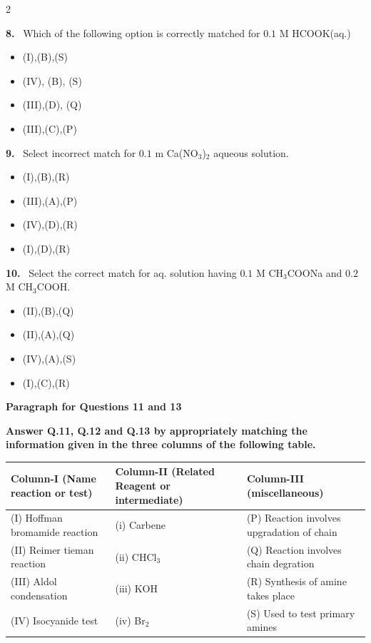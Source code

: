 \documentclass[10pt]{extarticle}
\newcommand{\qn}[1]{\par\smallskip\noindent\textbf{#1.}~}
\newcommand{\paraq}[2]{\par\smallskip\noindent\textbf{Paragraph for Questions #1 and #2}\par}
\newenvironment{qoptions}{\begin{itemize}[leftmargin=1.8em,itemsep=1pt,topsep=2pt,label={}]}{\end{itemize}}
\newcommand{\opt}[2]{\item[(#1)] #2}
\begin{document}
\begin{multicols}{2}
\qn{8} Which of the following option is correctly matched for $0.1$ M HCOOK(aq.)
\begin{qoptions}
\opt{A}{(I),(B),(S)}
\opt{B}{(IV), (B), (S)}
\opt{C}{(III),(D), (Q)}
\opt{D}{(III),(C),(P)}
\end{qoptions}
\qn{9} Select incorrect match for $0.1$ m Ca(NO$_3$)$_2$ aqueous solution.
\begin{qoptions}
\opt{A}{(I),(B),(R)}
\opt{B}{(III),(A),(P)}
\opt{C}{(IV),(D),(R)}
\opt{D}{(I),(D),(R)}
\end{qoptions}
\qn{10} Select the correct match for aq. solution having $0.1$ M CH$_3$COONa and $0.2$ M CH$_3$COOH.
\begin{qoptions}
\opt{A}{(II),(B),(Q)}
\opt{B}{(II),(A),(Q)}
\opt{C}{(IV),(A),(S)}
\opt{D}{(I),(C),(R)}
\end{qoptions}
\paraq{11}{13}
\noindent\textbf{Answer Q.11, Q.12 and Q.13 by appropriately matching the information given in the three columns of the following table.}\par
\end{multicols}
\begin{center}\small\setlength{\tabcolsep}{4pt}
\begin{tabular}{|p{3.8cm}|p{4.4cm}|p{5.8cm}|}\hline
\textbf{Column-I} (Name reaction or test) & \textbf{Column-II} (Related Reagent or intermediate) & \textbf{Column-III} (miscellaneous)\\\hline
(I) Hoffman bromamide reaction & (i) Carbene & (P) Reaction involves upgradation of chain\\\hline
(II) Reimer tieman reaction & (ii) CHCl$_3$ & (Q) Reaction involves chain degration\\\hline
(III) Aldol condensation & (iii) KOH & (R) Synthesis of amine takes place\\\hline
(IV) Isocyanide test & (iv) Br$_2$ & (S) Used to test primary amines\\\hline
\end{tabular}
\end{center}
\end{document}
